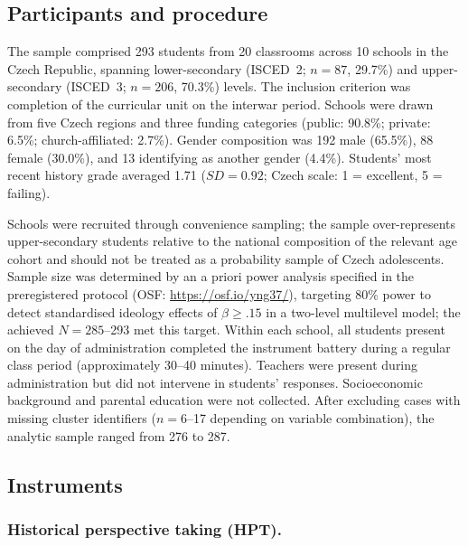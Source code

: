 \documentclass[pdflatex,sn-apa]{sn-jnl}%
\begin{document}
\subsection{Participants and procedure}\label{subsec:participants}

The sample comprised 293 students from 20 classrooms across 10 schools in the Czech Republic, spanning lower-secondary (ISCED~2; $n = 87$, 29.7\%) and upper-secondary (ISCED~3; $n = 206$, 70.3\%) levels. The inclusion criterion was completion of the curricular unit on the interwar period. Schools were drawn from five Czech regions and three funding categories (public: 90.8\%; private: 6.5\%; church-affiliated: 2.7\%). Gender composition was 192 male (65.5\%), 88 female (30.0\%), and 13 identifying as another gender (4.4\%). Students' most recent history grade averaged 1.71 ($SD = 0.92$; Czech scale: 1 = excellent, 5 = failing).

Schools were recruited through convenience sampling; the sample over-represents upper-secondary students relative to the national composition of the relevant age cohort and should not be treated as a probability sample of Czech adolescents. Sample size was determined by an a priori power analysis specified in the preregistered protocol (OSF: \url{https://osf.io/yng37/}), targeting 80\% power to detect standardised ideology effects of $\beta \geq .15$ in a two-level multilevel model; the achieved $N = 285$--293 met this target. Within each school, all students present on the day of administration completed the instrument battery during a regular class period (approximately 30--40 minutes). Teachers were present during administration but did not intervene in students' responses. Socioeconomic background and parental education were not collected. After excluding cases with missing cluster identifiers ($n = 6$--17 depending on variable combination), the analytic sample ranged from 276 to 287.

\subsection{Instruments}\label{subsec:instruments}

\subsubsection{Historical perspective taking (HPT).}\label{subsubsec:hpt}
\end{document}
